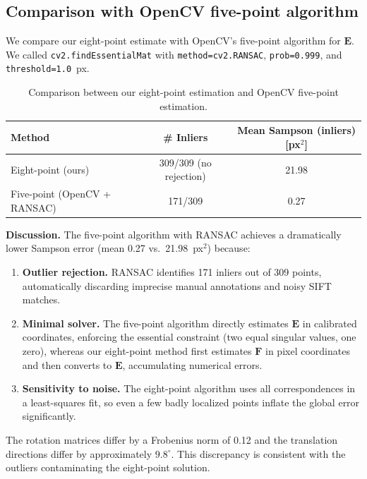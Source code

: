 \documentclass{article}
\begin{document}
\subsection{Comparison with OpenCV five-point algorithm}
We compare our eight-point estimate with OpenCV's five-point algorithm for $\mathbf{E}$.
We called \texttt{cv2.findEssentialMat} with \texttt{method=cv2.RANSAC}, \texttt{prob=0.999}, and \texttt{threshold=1.0}~px.

\begin{table}[h]
\centering
\begin{tabular}{l c c}
\toprule
Method & \# Inliers & Mean Sampson (inliers) [px$^2$] \\
\midrule
Eight-point (ours) & 309/309 (no rejection) & 21.98 \\
Five-point (OpenCV + RANSAC) & 171/309 & 0.27 \\
\bottomrule
\end{tabular}
\caption{Comparison between our eight-point estimation and OpenCV five-point estimation.}
\label{tab:compare_5pt}
\end{table}

\noindent\textbf{Discussion.}
The five-point algorithm with RANSAC achieves a dramatically lower Sampson error (mean 0.27 vs.\ 21.98~px$^2$) because:
\begin{enumerate}
\item \textbf{Outlier rejection.} RANSAC identifies 171 inliers out of 309 points, automatically discarding imprecise manual annotations and noisy SIFT matches.
\item \textbf{Minimal solver.} The five-point algorithm directly estimates $\mathbf{E}$ in calibrated coordinates, enforcing the essential constraint (two equal singular values, one zero), whereas our eight-point method first estimates $\mathbf{F}$ in pixel coordinates and then converts to $\mathbf{E}$, accumulating numerical errors.
\item \textbf{Sensitivity to noise.} The eight-point algorithm uses all correspondences in a least-squares fit, so even a few badly localized points inflate the global error significantly.
\end{enumerate}
The rotation matrices differ by a Frobenius norm of 0.12 and the translation directions differ by approximately $9.8^\circ$. This discrepancy is consistent with the outliers contaminating the eight-point solution.
\end{document}
